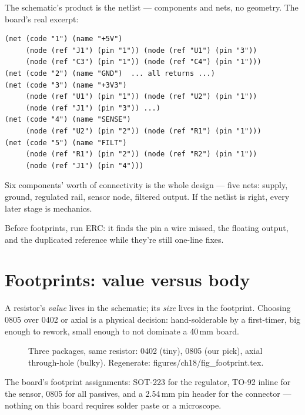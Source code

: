 \begin{example}
The schematic's product is the netlist --- components and nets, no
geometry. The board's real excerpt:

\begin{lstlisting}[caption={\ttfamily ch18\_sensor.net excerpt ---
the five nets, verbatim.}]
(net (code "1") (name "+5V")
     (node (ref "J1") (pin "1")) (node (ref "U1") (pin "3"))
     (node (ref "C3") (pin "1")) (node (ref "C4") (pin "1")))
(net (code "2") (name "GND")  ... all returns ...)
(net (code "3") (name "+3V3")
     (node (ref "U1") (pin "1")) (node (ref "U2") (pin "1"))
     (node (ref "J1") (pin "3")) ...)
(net (code "4") (name "SENSE")
     (node (ref "U2") (pin "2")) (node (ref "R1") (pin "1")))
(net (code "5") (name "FILT")
     (node (ref "R1") (pin "2")) (node (ref "R2") (pin "1"))
     (node (ref "J1") (pin "4")))
\end{lstlisting}

Six components' worth of connectivity is the whole design --- five
nets: supply, ground, regulated rail, sensor node, filtered output.
If the netlist is right, every later stage is mechanics.
\end{example}

\begin{checkpoint}
Before footprints, run ERC: it finds the pin a wire missed, the
floating output, and the duplicated reference while they're still
one-line fixes.
\end{checkpoint}

\section{Footprints: value versus body}\label{sec:footprint18}

A resistor's \emph{value} lives in the schematic; its \emph{size}
lives in the footprint. Choosing 0805 over 0402 or axial is a
physical decision: hand-solderable by a first-timer, big enough to
rework, small enough to not dominate a 40\,mm board.

\begin{figure}[htbp]
\centering

\caption{Three packages, same resistor: 0402 (tiny), 0805 (our pick),
axial through-hole (bulky). Regenerate: \ttfamily
figures/ch18/fig\_footprint.tex.}
\label{fig:footprint18}
\end{figure}

The board's footprint assignments: SOT-223 for the regulator,
TO-92 inline for the sensor, 0805 for all passives, and a
2.54\,mm pin header for the connector --- nothing on this board
requires solder paste or a microscope.

